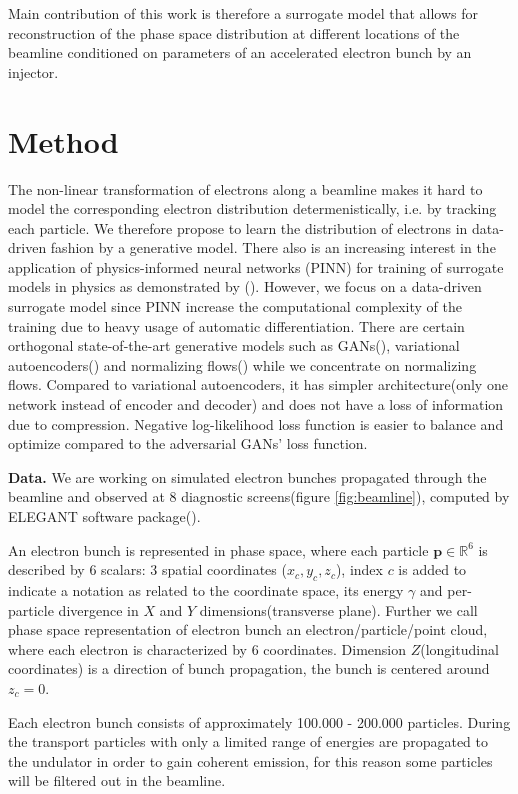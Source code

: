 \documentclass{article}
\begin{document}
Main contribution of this work is therefore a surrogate model that allows for reconstruction of the phase space distribution at different locations of the beamline conditioned on parameters of an accelerated electron bunch by an injector. 

\section{Method}
The non-linear transformation of electrons along a beamline makes it hard to model the corresponding electron distribution determenistically, i.e. by tracking each particle. We therefore propose to learn the distribution of electrons in data-driven fashion by a generative model. There also is an increasing interest in the application of physics-informed neural networks (PINN) for training of surrogate models in physics as demonstrated by (\citet{Stiller2020}). However, we focus on a data-driven surrogate model since PINN increase the computational complexity of the training due to heavy usage of automatic differentiation. There are certain orthogonal state-of-the-art generative models such as GANs(\citet{goodfellow2014generative}), variational autoencoders(\citet{kingma2019introduction}) and normalizing flows(\citet{dinhnice}) while we concentrate on normalizing flows. Compared to variational autoencoders, it has simpler architecture(only one network instead of encoder and decoder) and does not have a loss of information due to compression. 
Negative log-likelihood loss function is easier to balance and optimize compared to the adversarial GANs' loss function.

\textbf{Data.}
We are working on simulated electron bunches propagated through the beamline and observed at 8 diagnostic screens(figure \ref{fig:beamline}), computed by ELEGANT software package(\citet{elegant}).

An electron bunch is represented in phase space, where each particle $\bm{p} \in \mathbb{R}^6$ is described by 6 scalars: 3 spatial coordinates ($x_c,y_c,z_c$), index $c$ is added to indicate a notation as related to the coordinate space, its energy $\gamma$ and per-particle divergence in $X$ and $Y$ dimensions(transverse plane). 
Further we call phase space representation of electron bunch an electron/particle/point cloud, where each electron is characterized by 6 coordinates.
Dimension $Z$(longitudinal coordinates) is a direction of bunch propagation, the bunch is centered around $z_c=0$. 

Each electron bunch consists of approximately 100.000 - 200.000 particles. 
During the transport particles with only a limited range of energies are propagated to the undulator in order to gain coherent emission, for this reason some particles will be filtered out in the beamline. 
\end{document}
